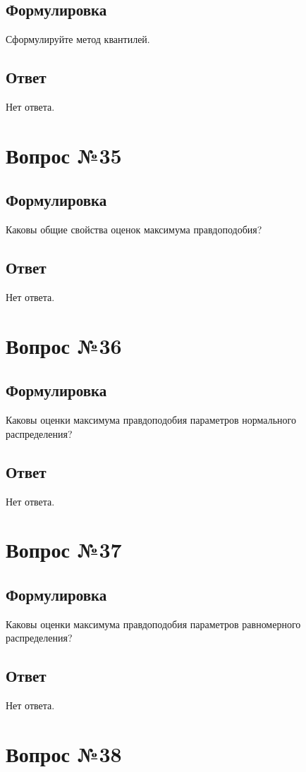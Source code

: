 \documentclass[a4]{article}
\begin{document}
	\subsection*{Формулировка}
	Сформулируйте метод квантилей.
	\subsection*{Ответ}
	Нет ответа.
	
	\section{Вопрос №35}
	\subsection*{Формулировка}
	Каковы общие свойства оценок максимума правдоподобия?
	\subsection*{Ответ}
	Нет ответа.
	
	\section{Вопрос №36}
	\subsection*{Формулировка}
	Каковы оценки максимума правдоподобия параметров нормального распределения?
	\subsection*{Ответ}
	Нет ответа.
	
	\section{Вопрос №37}
	\subsection*{Формулировка}
	Каковы оценки максимума правдоподобия параметров равномерного распределения?
	\subsection*{Ответ}
	Нет ответа.
	
	\section{Вопрос №38}
\end{document}
